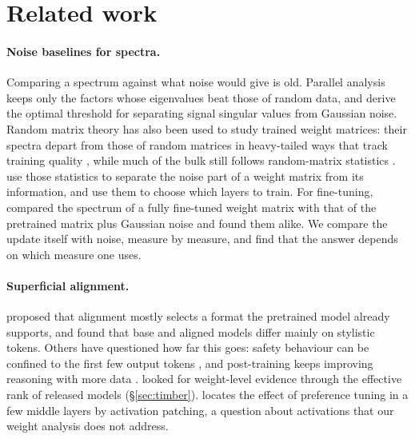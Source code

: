 \section{Related work}
\label{sec:related}

\paragraph{Noise baselines for spectra.} Comparing a spectrum against what
noise would give is old. Parallel analysis \citep{horn1965parallel} keeps only
the factors whose eigenvalues beat those of random data, and
\citet{gavish2014optimal} derive the optimal threshold for separating signal
singular values from Gaussian noise. Random matrix theory has also been used to
study trained weight matrices: their spectra depart from those of random
matrices in heavy-tailed ways that track training quality
\citep{martin2021implicit}, while much of the bulk still follows random-matrix
statistics \citep{thamm2022random}. \citet{staats2023boundary} use those
statistics to separate the noise part of a weight matrix from its information,
and \citet{hartford2024spectrum} use them to choose which layers to train. For
fine-tuning, \citet{biderman2024lora}
compared the spectrum of a fully fine-tuned weight matrix with that of the
pretrained matrix plus Gaussian noise and found them alike. We compare the
update itself with noise, measure by measure, and find that the answer depends
on which measure one uses.

\paragraph{Superficial alignment.} \citet{zhou2023lima} proposed that
alignment mostly selects a format the pretrained model already supports, and
\citet{lin2024urial} found that base and aligned models differ mainly on
stylistic tokens. Others have questioned how far this goes: safety behaviour
can be confined to the first few output tokens \citep{qi2025safety}, and
post-training keeps improving reasoning with more data
\citep{raghavendra2024revisiting}. \citet{wu2025timber} looked for
weight-level evidence through the effective rank of released models
(\S\ref{sec:timber}). \citet{chaudhury2025alignment} locates the effect of
preference tuning in a few middle layers by activation patching, a question
about activations that our weight analysis does not address.

